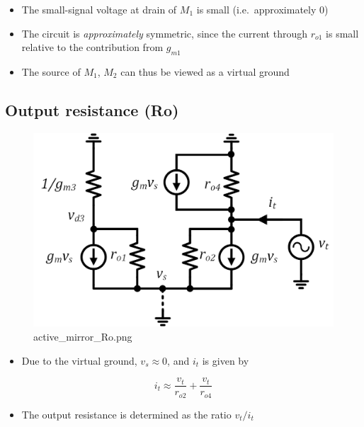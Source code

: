 \documentclass[11pt]{article}
\providecommand{\tightlist}{%
      \setlength{\itemsep}{0pt}\setlength{\parskip}{0pt}}
\begin{document}
    \begin{itemize}
\tightlist
\item
  The small-signal voltage at drain of \(M_1\) is small
  (i.e.~approximately \(0\))
\item
  The circuit is \emph{approximately} symmetric, since the current
  through \(r_{o1}\) is small relative to the contribution from
  \(g_{m1}\)
\item
  The source of \(M_1\), \(M_2\) can thus be viewed as a virtual ground
\end{itemize}

    \hypertarget{output-resistance-ro}{%
\subsection{Output resistance (Ro)}\label{output-resistance-ro}}

    \begin{figure}
\centering
\includegraphics{active_mirror_Ro.png}
\caption{active\_mirror\_Ro.png}
\end{figure}

    \begin{itemize}
\tightlist
\item
  Due to the virtual ground, \(v_s \approx 0\), and \(i_t\) is given by
\end{itemize}

\begin{equation}
i_t \approx \dfrac{v_t}{r_{o2}} + \dfrac{v_t}{r_{o4}}
\end{equation}

\begin{itemize}
\tightlist
\item
  The output resistance is determined as the ratio \(v_t/i_t\)
\end{itemize}
\end{document}
